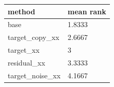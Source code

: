 \begin{tabular}{ll}
\toprule
method & mean rank \\
\midrule
base & 1.8333 \\
target\_copy\_xx & 2.6667 \\
target\_xx & 3 \\
residual\_xx & 3.3333 \\
target\_noise\_xx & 4.1667 \\
\bottomrule
\end{tabular}
